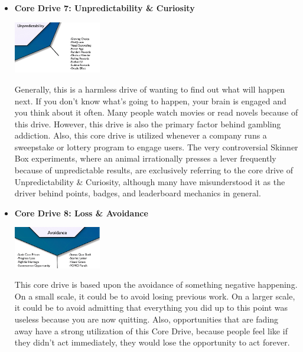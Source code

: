 \begin{itemize}
      \item \textbf{Core Drive 7: Unpredictability \& Curiosity}
    \begin{center}
        \includegraphics[width= 0.3\textwidth]{images/core-drive-7-unpredictability-and-curiosity.png}
    \end{center}
Generally, this is a harmless drive of wanting to find out what will happen next. If you don’t know what’s going to happen, your brain is engaged and you think about it often. Many people watch movies or read novels because of this drive. However, this drive is also the primary factor behind gambling addiction. Also, this core drive is utilized whenever a company runs a sweepstake or lottery program to engage users. The very controversial Skinner Box experiments, where an animal irrationally presses a lever frequently because of unpredictable results, are exclusively referring to the core drive of Unpredictability \& Curiosity, although many have misunderstood it as the driver behind points, badges, and leaderboard mechanics in general.

      \item \textbf{Core Drive 8: Loss \& Avoidance}
    \begin{center}
        \includegraphics[width= 0.3\textwidth]{images/core-drive-8-loss-and-avoidance.png}
    \end{center}
This core drive is based upon the avoidance of something negative happening. On a small scale, it could be to avoid losing previous work. On a larger scale, it could be to avoid admitting that everything you did up to this point was useless because you are now quitting. Also, opportunities that are fading away have a strong utilization of this Core Drive, because people feel like if they didn’t act immediately, they would lose the opportunity to act forever.
\end{itemize}

